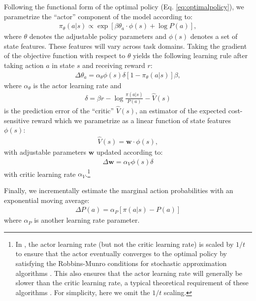 \documentclass[11pt]{article}
\begin{document}
Following the functional form of the optimal policy (Eq. \ref{eq:optimalpolicy}), we parametrize the ``actor'' component of the model according to:
\begin{align}
\pi_\theta(a|s) \propto \exp \left[ \beta \theta_a \cdot \phi(s) + \log P(a) \right],
\end{align}
where $\theta$ denotes the adjustable policy parameters and $\phi(s)$ denotes a set of state features. These features will vary across task domains. Taking the gradient of the objective function with respect to $\theta$ yields the following learning rule after taking action $a$ in state $s$ and receiving reward $r$:
\begin{align}
\Delta \theta_a = \alpha_\theta \phi(s) \delta [1 - \pi_{\theta}(a|s)]\beta,
\end{align}
where $\alpha_\theta$ is the actor learning rate and
\begin{align}
\delta = \beta r -  \log \frac{\pi(a|s)}{P(a)} - \hat{V}(s)
\end{align}
is the prediction error of the ``critic'' $\hat{V}(s)$, an estimator of the expected cost-sensitive reward which we parametrize as a linear function of state features $\phi(s)$:
\begin{align}
    \hat{V}(s)= \mathbf{w} \cdot \phi(s),
\end{align}
with adjustable parameters $\mathbf{w}$ updated according to:
\begin{align}
\Delta \mathbf{w} = \alpha_V \phi(s) \delta
\end{align}
with critic learning rate $\alpha_V$.\footnote{In \citet{gershmanlai20}, the actor learning rate (but not the critic learning rate) is scaled by $1/t$ to ensure that the actor eventually converges to the optimal policy by satisfying the Robbins-Munro conditions for stochastic approximation algorithms \citep{robbins51}. This also ensures that the actor learning rate will generally be slower than the critic learning rate, a typical theoretical requirement of these algorithms \citep{konda00}. For simplicity, here we omit the $1/t$ scaling.}

Finally, we incrementally estimate the marginal action probabilities with an exponential moving average:
\begin{align}
\Delta P(a) = \alpha_P [\pi(a|s) - P(a)]
\end{align}
where $\alpha_P$ is another learning rate parameter.
\end{document}
